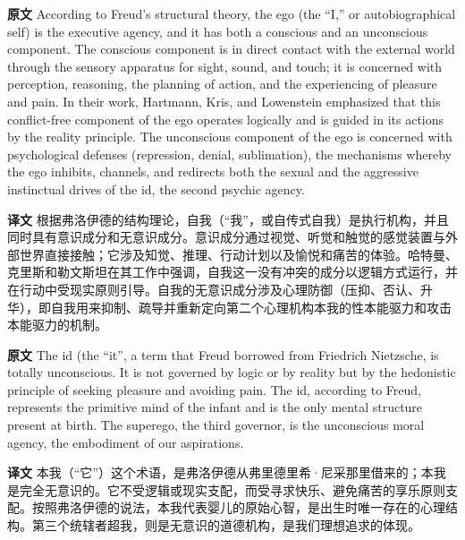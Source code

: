 \documentclass[UTF8]{ctexart}
\newenvironment{english}{\par\small\noindent\textbf{原文}\quad\ignorespaces}{\par}
\newenvironment{zhtranslation}{\par\noindent\textbf{译文}\quad\ignorespaces}{\par\vspace{0.35em}}
\begin{document}
\begin{english}
According to Freud's structural theory, the ego (the “I,” or autobiographical self) is the executive agency, and it has both a conscious and an unconscious component. The conscious component is in direct contact with the external world through the sensory apparatus for sight, sound, and touch; it is concerned with perception, reasoning, the planning of action, and the experiencing of pleasure and pain. In their work, Hartmann, Kris, and Lowenstein emphasized that this conflict-free component of the ego operates logically and is guided in its actions by the reality principle. The unconscious component of the ego is concerned with psychological defenses (repression, denial, sublimation), the mechanisms whereby the ego inhibits, channels, and redirects both the sexual and the aggressive instinctual drives of the id, the second psychic agency.
\end{english}
\begin{zhtranslation}
根据弗洛伊德的结构理论，自我（“我”，或自传式自我）是执行机构，并且同时具有意识成分和无意识成分。意识成分通过视觉、听觉和触觉的感觉装置与外部世界直接接触；它涉及知觉、推理、行动计划以及愉悦和痛苦的体验。哈特曼、克里斯和勒文斯坦在其工作中强调，自我这一没有冲突的成分以逻辑方式运行，并在行动中受现实原则引导。自我的无意识成分涉及心理防御（压抑、否认、升华），即自我用来抑制、疏导并重新定向第二个心理机构本我的性本能驱力和攻击本能驱力的机制。\end{zhtranslation}

\begin{english}
The id (the “it”, a term that Freud borrowed from Friedrich Nietzsche, is totally unconscious. It is not governed by logic or by reality but by the hedonistic principle of seeking pleasure and avoiding pain. The id, according to Freud, represents the primitive mind of the infant and is the only mental structure present at birth. The superego, the third governor, is the unconscious moral agency, the embodiment of our aspirations.
\end{english}
\begin{zhtranslation}
本我（“它”）这个术语，是弗洛伊德从弗里德里希·尼采那里借来的；本我是完全无意识的。它不受逻辑或现实支配，而受寻求快乐、避免痛苦的享乐原则支配。按照弗洛伊德的说法，本我代表婴儿的原始心智，是出生时唯一存在的心理结构。第三个统辖者超我，则是无意识的道德机构，是我们理想追求的体现。\end{zhtranslation}
\end{document}
